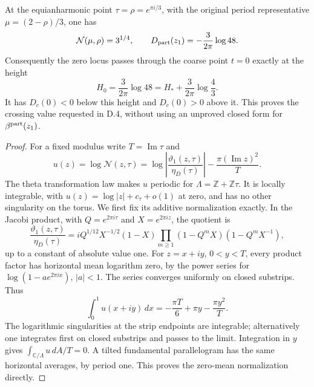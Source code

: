 \begin{proposition}[D.4.5; Proved]
At the equianharmonic point \(\tau=\rho=e^{\pi i/3}\), with the
original period representative \(\mu=(2-\rho)/3\), one has
\[
 \mathcal N(\mu,\rho)=3^{1/4},\qquad
 D_{\rm part}(z_1)=-\frac3{2\pi}\log48.
\]
Consequently the zero locus passes through the coarse point \(t=0\)
exactly at the height
\[
 H_0=\frac3{2\pi}\log48
 =H_*+\frac3{2\pi}\log\frac43.
\]
It has \(D_c(0)<0\) below this height and \(D_c(0)>0\) above it.
This proves the crossing value requested in D.4, without using an
unproved closed form for \(\beta^{\rm part}(z_1)\).
\end{proposition}
\begin{proof}
For a fixed modulus write \(T=\operatorname{Im}\tau\) and
\[
 u(z)=\log\mathcal N(z,\tau)
 =\log\left|\frac{\vartheta_1(z,\tau)}{\eta_D(\tau)}\right|
       -\frac{\pi(\operatorname{Im}z)^2}{T}.
\]
The theta transformation law makes \(u\) periodic for
\(\Lambda=\mathbb Z+\mathbb Z\tau\). It is locally integrable,
with \(u(z)=\log|z|+c_\tau+o(1)\) at zero, and has no other
singularity on the torus. We first fix its additive normalization
exactly. In the Jacobi product, with
\(Q=e^{2\pi i\tau}\) and \(X=e^{2\pi iz}\), the quotient is
\[
 \frac{\vartheta_1(z,\tau)}{\eta_D(\tau)}
 =iQ^{1/12}X^{-1/2}(1-X)
       \prod_{m\ge1}(1-Q^mX)(1-Q^mX^{-1}),
\]
up to a constant of absolute value one. For
\(z=x+iy\), \(0<y<T\), every product factor has horizontal
mean logarithm zero, by the power series for
\(\log(1-ae^{2\pi ix})\), \(|a|<1\). The series converges
uniformly on closed substrips. Thus
\[
 \int_0^1u(x+iy)\,dx
       =-\frac{\pi T}{6}+\pi y-\frac{\pi y^2}{T}.
\]
The logarithmic singularities at the strip endpoints are
integrable; alternatively one integrates first on closed substrips
and passes to the limit. Integration in \(y\) gives
\(\int_{\mathbb C/\Lambda}u\,dA/T=0\). A tilted fundamental
parallelogram has the same horizontal averages, by period one.
This proves the zero-mean normalization directly.


\end{proof}
